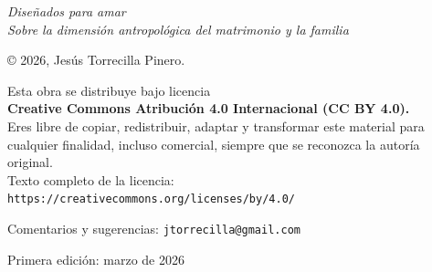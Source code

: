 \thispagestyle{empty}

\vspace*{\fill}

\begingroup
\small\color{negro}
\noindent\textit{Diseñados para amar}\\
\textit{Sobre la dimensión antropológica del matrimonio y la familia}

\vspace{1.5em}

\noindent © 2026, Jesús Torrecilla Pinero.

\vspace{1em}

\noindent Esta obra se distribuye bajo licencia\\
\textbf{Creative Commons Atribución 4.0 Internacional (CC BY 4.0).}\\[0.5em]
Eres libre de copiar, redistribuir, adaptar y transformar este material
para cualquier finalidad, incluso comercial, siempre que se reconozca
la autoría original.\\
Texto completo de la licencia:\\
\texttt{https://creativecommons.org/licenses/by/4.0/}

\vspace{1em}

\noindent Comentarios y sugerencias: \texttt{jtorrecilla@gmail.com}

\vspace{1.5em}

\noindent
Primera edición: marzo de 2026
\endgroup
\normalsize
\clearpage
